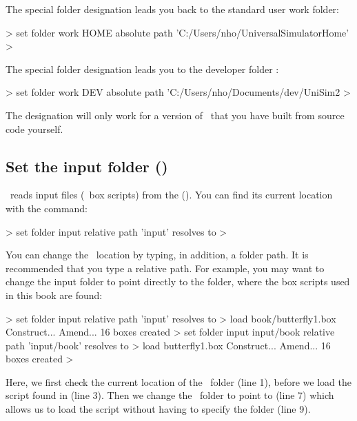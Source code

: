 The special folder designation  leads you back to the standard user work folder:

\begin{usdialog}
> set folder work HOME
absolute path 'C:/Users/nho/UniversalSimulatorHome'
> 
\end{usdialog}

The special folder designation  leads you to the developer folder \devhomefolderexplained:

\begin{usdialog}
> set folder work DEV
absolute path 'C:/Users/nho/Documents/dev/UniSim2
> 
\end{usdialog}

The  designation will only work for a version of \US\ that you have built from source code yourself.

\subsection{Set the input folder ()}
\US\ reads input files (\eg\ box scripts) from the  (). You can find its current location with the  command:

\begin{usdialog}
> set folder input
relative path 'input' resolves to %
> \end{usdialog}

You can change the \ location by typing, in addition, a folder path. It is recommended that you type a relative path. For example, you may want to change the input folder to point directly to the folder, where the box scripts used in this book are found:

\lstset{numbers=left}
\begin{usdialog}
> set folder input 
relative path 'input' resolves to %
> load book/butterfly1.box
Construct...
Amend...
16 boxes created
> set folder input input/book
relative path 'input/book' resolves to %
> load butterfly1.box
Construct...
Amend...
16 boxes created
> 
\end{usdialog}
\lstset{numbers=none}

Here, we first check the current location of the \ folder (line 1), before we load the  script found in  (line 3). Then we change the \ folder to point to  (line 7) which allows us to load the  script without having to specify the  folder (line 9).

